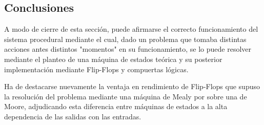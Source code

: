 \subsection{Conclusiones}
A modo de cierre de esta sección, puede afirmarse el correcto funcionamiento del sistema procedural mediante el cual, dado un problema que tomaba distintas acciones antes 
distintos "momentos" en su funcionamiento, se lo puede resolver mediante el planteo de una máquina de estados teórica y su posterior implementación mediante Flip-Flops y 
compuertas lógicas.

Ha de destacarse nuevamente la ventaja en rendimiento de Flip-Flops que supuso la resolución del problema mediante una máquina de Mealy por sobre una de Moore, adjudicando 
esta diferencia entre máquinas de estados a la alta dependencia de las salidas con las entradas.